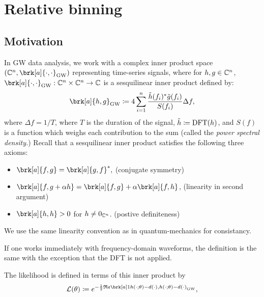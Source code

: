 
\section{Relative binning}
\subsection{Motivation}
In GW data analysis, we work with a complex inner product space $(\com^n, \brk[a]{\cdot,\cdot}_{\text{GW}})$ representing time-series signals, where for $h,g \in \mathbb{C}^n$, $\brk[a]{\cdot,\cdot}_{\text{GW}}:\com^n \times \com^n \to \com$ is a sesquilinear inner product defined by:
\begin{equation}\label{eq:gw-inner}
\brk[a]{h,g}_{\text{GW}} \defn 4 \sum_{i=1}^n \frac{\tilde{h}(f_i)^* \tilde{g}(f_i)}{S(f_i)} \Delta f,
\end{equation}
where $\Delta f = 1/T$, where $T$ is the duration of the signal, $\tilde{h} \coloneqq \text{DFT}(h)$, and $S(f)$ is a function which weighs each contribution to the sum (called the \textit{power spectral density.})
Recall that a sesquilinear inner product satisfies the following three axioms:
\begin{itemize}
  \item $\brk[a]{f,g} = \brk[a]{g,f}^*,$ \hfill{(conjugate symmetry)}
  \item $\brk[a]{f, g + \alpha h} = \brk[a]{f,g} + \alpha \brk[a]{f,h}$, \hfill{(linearity in second argument)}
  \item $\brk[a]{h,h} > 0$ for $h \neq 0_{\mathbb{C}^n}$. \hfill{(postive definiteness)}
\end{itemize}
\begin{remark}[]\label{}
We use the same linearity convention as in quantum-mechanics for consistancy.
\end{remark}
\begin{remark}[]\label{}
If one works immediately with frequency-domain waveforms, the definition is the same with the exception that the DFT is not applied.
\end{remark}
%
The likelihood is defined in terms of this inner product by
\begin{equation}\label{}
\like(\theta) \defn e^{-\frac{1}{2} \re \brk[a]1{h(\cdot ; \theta) - d(\cdot),h(\cdot ; \theta) - d(\cdot)}_{\text{GW}}},
\end{equation}
